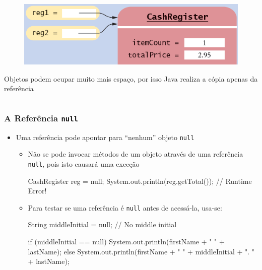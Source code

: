 \documentclass[xcolor={dvipsnames,table},aspectratio=169]{beamer}
\begin{document}
\begin{frame}[fragile]
\begin{columns}[T]
\begin{column}{0.5\linewidth}
\begin{itemize}
{\begin{figure}[h]
	\includegraphics[height=0.12\paperheight,center]{pucrs-ep-fprog-unidade_07-objetos_e_classes-laminas-copia_de_referencias.png}
\end{figure}
	\item Objetos podem ocupar muito mais espaço, por isso Java realiza a cópia apenas da referência
}
\end{itemize}
	\end{column}
\end{columns}
\end{frame}

\begin{frame}[fragile]\frametitle{A Referência \texttt{null}}
\begin{itemize}
	\item Uma referência pode apontar para ``nenhum'' objeto \texttt{null}
	\begin{itemize}
		\item Não se pode invocar métodos de um objeto através de uma referência \texttt{null}, pois isto causará uma exceção
\begin{javacode}
CashRegister reg = null;
System.out.println(reg.getTotal());   // Runtime Error!
\end{javacode}
		\item Para testar se uma referência é \texttt{null} antes de acessá-la, usa-se:
{\footnotesize
\begin{javacode}
String middleInitial = null; // No middle initial

if (middleInitial == null)
  System.out.println(firstName + " " + lastName);
else
  System.out.println(firstName + " " + middleInitial + ". " + lastName);
\end{javacode}
}
	\end{itemize}
\end{itemize}
\end{frame}
\end{document}
